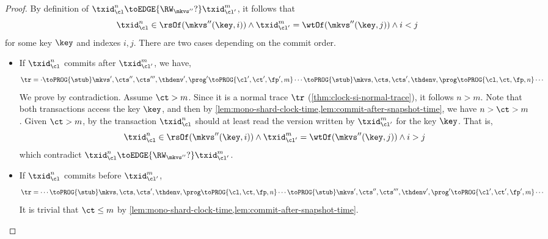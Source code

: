 \begin{proof}
    By definition of \( \txid_\cl^n \toEDGE{\RW_{\mkvs''}?} \txid_{\cl'}^m \),
    it follows that
    \[
        \txid_\cl^n \in \rsOf(\mkvs''(\key,i)) 
        \land \txid_{\cl'}^m = \wtOf(\mkvs''(\key,j)) 
        \land i < j
    \]                              
    for some key \( \key \) and indexes \( i,j \).
    There are two cases depending on the commit order.
    \begin{itemize}
        \item If \( \txid_\cl^n \) commits after \( \txid_{\cl'}^m  \),
            we have,
            \[
                \begin{array}{@{}l@{}}
                \tr = \cdot \toPROG{\stub} \mkvs',\cts'',\cts''',\thdenv', \prog' \toPROG{\cl',\ct',\fp',m} \cdots
                \toPROG{\stub} \mkvs,\cts,\cts',\thdenv, \prog \toPROG{\cl,\ct,\fp,n} \cdots \\
                \end{array}
            \]
            We prove by contradiction.
            Assume \( \ct > m \).
            Since it is a normal trace \( \tr \) (\cref{thm:clock-si-normal-trace}), 
            it follows \( n > m \).
            Note that both transactions access the key \( \key \), and then by \cref{lem:mono-shard-clock-time,lem:commit-after-snapshot-time}, we have \( n > \ct > m  \).
            Given \( \ct > m \), by  the transaction \( \txid_\cl^n \) should at least read the version written by \( \txid_{\cl'}^m \) for the key \( \key \).
            That is,
            \[
                \txid_\cl^n \in \rsOf(\mkvs''(\key,i)) 
                \land \txid_{\cl'}^m = \wtOf(\mkvs''(\key,j)) 
                \land i > j
            \]
            which contradict  \( \txid_\cl^n \toEDGE{\RW_{\mkvs''}?} \txid_{\cl'}^m  \).
        \item If \( \txid_\cl^n \) commits before \( \txid_{\cl'}^m  \),
            \[
                \begin{array}{@{}l@{}}
                    \tr = \cdots \toPROG{\stub} \mkvs,\cts,\cts',\thdenv, \prog \toPROG{\cl,\ct,\fp,n} \cdots
                    \toPROG{\stub} \mkvs',\cts'',\cts''',\thdenv', \prog' \toPROG{\cl',\ct',\fp',m} \cdots
                \end{array}
            \]
            It is trivial that \( \ct \leq m \) by \cref{lem:mono-shard-clock-time,lem:commit-after-snapshot-time}.
    \end{itemize}
\end{proof}

